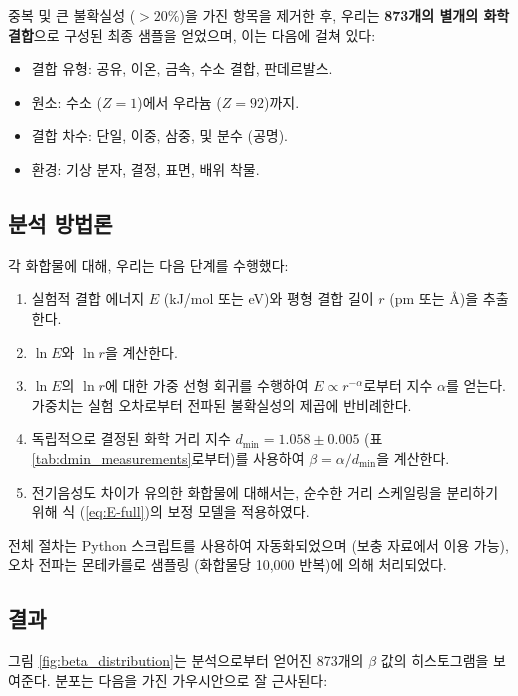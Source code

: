 \documentclass[12pt,a4paper]{article}
\begin{document}
	중복 및 큰 불확실성 (\(>20\%\))을 가진 항목을 제거한 후, 우리는 \textbf{873개의 별개의 화학 결합}으로 구성된 최종 샘플을 얻었으며, 이는 다음에 걸쳐 있다:
	\begin{itemize}
		\item 결합 유형: 공유, 이온, 금속, 수소 결합, 판데르발스.
		\item 원소: 수소 (\(Z=1\))에서 우라늄 (\(Z=92\))까지.
		\item 결합 차수: 단일, 이중, 삼중, 및 분수 (공명).
		\item 환경: 기상 분자, 결정, 표면, 배위 착물.
	\end{itemize}
	
	\subsection{분석 방법론}
	
	각 화합물에 대해, 우리는 다음 단계를 수행했다:
	
	\begin{enumerate}
		\item 실험적 결합 에너지 \(E\) (kJ/mol 또는 eV)와 평형 결합 길이 \(r\) (pm 또는 Å)을 추출한다.
		\item \(\ln E\)와 \(\ln r\)을 계산한다.
		\item \(\ln E\)의 \(\ln r\)에 대한 가중 선형 회귀를 수행하여 \(E \propto r^{-\alpha}\)로부터 지수 \(\alpha\)를 얻는다. 가중치는 실험 오차로부터 전파된 불확실성의 제곱에 반비례한다.
		\item 독립적으로 결정된 화학 거리 지수 \(d_{\text{min}} = 1.058 \pm 0.005\) (표 \ref{tab:dmin_measurements}로부터)를 사용하여 \(\beta = \alpha / d_{\text{min}}\)을 계산한다.
		\item 전기음성도 차이가 유의한 화합물에 대해서는, 순수한 거리 스케일링을 분리하기 위해 식 (\ref{eq:E-full})의 보정 모델을 적용하였다.
	\end{enumerate}
	
	전체 절차는 Python 스크립트를 사용하여 자동화되었으며 (보충 자료에서 이용 가능), 오차 전파는 몬테카를로 샘플링 (화합물당 10,000 반복)에 의해 처리되었다.
	
	\subsection{결과}
	
	그림 \ref{fig:beta_distribution}는 분석으로부터 얻어진 873개의 \(\beta\) 값의 히스토그램을 보여준다. 분포는 다음을 가진 가우시안으로 잘 근사된다:
	
\end{document}

